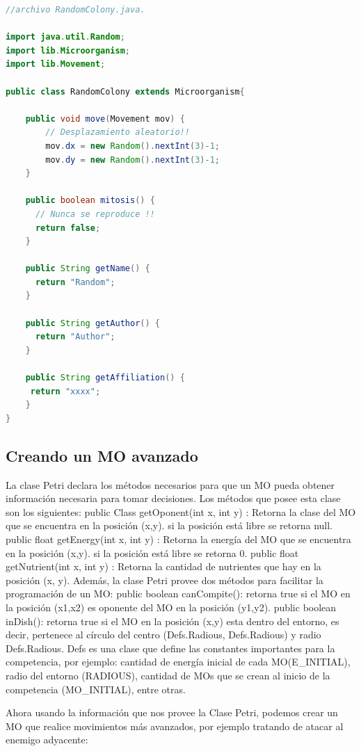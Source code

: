 \documentclass[11pt,a4paper]{article}
\begin{document}
\begin{lstlisting}[style=Code, language=Java]
//archivo RandomColony.java.

import java.util.Random;
import lib.Microorganism;
import lib.Movement;

public class RandomColony extends Microorganism{

    public void move(Movement mov) {
        // Desplazamiento aleatorio!!
        mov.dx = new Random().nextInt(3)-1;
        mov.dy = new Random().nextInt(3)-1;
    }

    public boolean mitosis() {
      // Nunca se reproduce !!
      return false;
    }

    public String getName() {
      return "Random";
    }

    public String getAuthor() {
      return "Author";
    }

    public String getAffiliation() {
     return "xxxx";
    }
}
\end{lstlisting}

\subsection{Creando un MO avanzado}
La clase Petri declara los métodos necesarios para que un MO pueda obtener información necesaria para tomar decisiones.
Los métodos que posee esta clase son los siguientes:
public Class getOponent(int x, int y) : Retorna la clase del MO que se encuentra en la posición (x,y). si la posición está libre se retorna null.
public float getEnergy(int x, int y) : Retorna la energía del MO que se encuentra en la posición (x,y). si la posición está libre se retorna 0.
public float getNutrient(int x, int y) : Retorna la cantidad de nutrientes que hay en la posición (x, y).
Además, la clase Petri provee dos métodos para facilitar la programación de un MO:
public boolean canCompite(): retorna true si el MO en la posición (x1,x2) es oponente del MO en la posición (y1,y2).
public boolean inDish(): retorna true si el MO en la posición (x,y) esta dentro del entorno, es decir, pertenece al círculo del centro (Defs.Radious, Defs.Radious) y radio Defs.Radious. Defs es una clase que define las constantes importantes para la competencia, por ejemplo: cantidad de energía inicial de cada MO(E\_INITIAL), radio del entorno (RADIOUS), cantidad de MOs que se crean al inicio de la competencia (MO\_INITIAL), entre otras.

Ahora usando la información que nos provee la Clase Petri, podemos crear un MO que realice movimientos más avanzados, por ejemplo tratando de atacar al enemigo adyacente:
\end{document}
